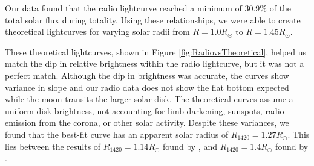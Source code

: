 Our data found that the radio lightcurve reached a minimum of 30.9\% of the total solar flux during totality.
Using these relationships, we were able to create theoretical lightcurves for varying solar radii from $R = 1.0 R_{\odot}$ to $R = 1.45 R_{\odot}$.

These theoretical lightcurves, shown in Figure \ref{fig:RadiovsTheoretical}, helped us match the dip in relative brightness within the radio lightcurve, but it was not a perfect match.
Although the dip in brightness was accurate, the curves show variance in slope and our radio data does not show the flat bottom expected while the moon transits the larger solar disk.
The theoretical curves assume a uniform disk brightness, not accounting for limb darkening, sunspots, radio emission from the corona, or other solar activity.
Despite these variances, we found that the best-fit curve has an apparent solar radius of $R_{\mathrm{1420}} = 1.27 R_{\odot}$.
This lies between the results of $R_{\mathrm{1420}} = 1.14 R_{\odot}$ found by \cite{messerotti_radio_2000}, and $R_{\mathrm{1420}} = 1.4 R_{\odot}$ found by \cite{leung_solar_2022}.




